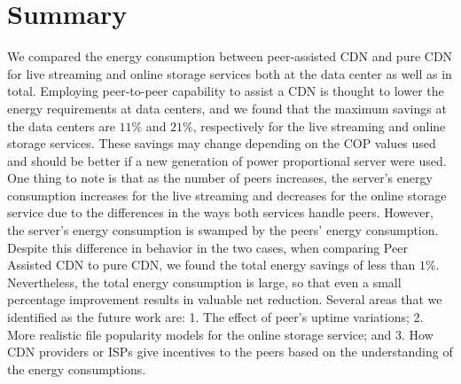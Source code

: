 \section{Summary}\label{summary6}

We compared the energy consumption between peer-assisted CDN and pure CDN for live streaming and online storage services both at the data center as well as in total.
Employing peer-to-peer capability to assist a CDN is thought to lower the energy requirements at data centers, and we found that the maximum savings at the data centers are $11$\% and $21$\%, respectively for the live streaming and online storage services. 
These savings may change depending on the COP values used and should be better if a new generation of power proportional server were used.
One thing to note is that as the number of peers increases, the server’s energy consumption increases for the live streaming and decreases for the online storage service due to the differences in the ways both services handle peers.
However, the server’s energy consumption is swamped by the peers’ energy consumption. 
Despite this difference in behavior in the two cases, when comparing Peer Assisted CDN to pure CDN, we found the total energy savings of less than $1$\%. 
Nevertheless, the total energy consumption is large, so that even a small percentage improvement results in valuable net reduction.
Several areas that we identified as the future work are: 1. The effect of peer’s uptime variations; 2. More realistic file popularity models for the online storage service; and 3. How CDN providers or ISPs give incentives to the peers based on the understanding of the energy consumptions.


